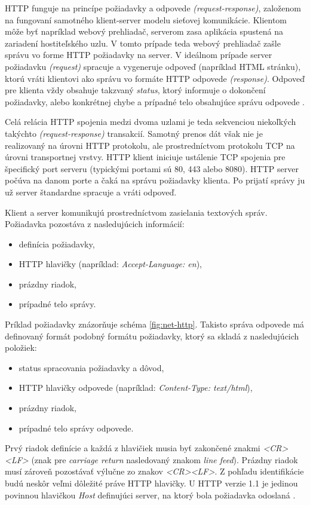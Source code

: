 \documentclass[
  digital, %
  oneside, %
  table,   %
  lof,     %
  nolot,   %
  nocover
]{fithesis3}
\begin{document}
HTTP funguje na princípe požiadavky a odpovede \textit{(request-response)},
založenom na fungovaní samotného klient-server modelu sieťovej komunikácie. Klientom môže byť
napríklad webový prehliadač, serverom zasa aplikácia spustená na zariadení
hostiteľského uzlu. V tomto prípade teda webový prehliadač zašle správu vo
forme HTTP požiadavky na server. V ideálnom prípade server požiadavku
\textit{(request)} spracuje a vygeneruje odpoveď (napríklad HTML stránku),
ktorú vráti klientovi ako správu vo formáte HTTP odpovede \textit{(response)}.
Odpoveď pre klienta vždy obsahuje takzvaný \textit{status}, ktorý informuje o
dokončení požiadavky, alebo konkrétnej chybe a prípadné telo obsahujúce správu odpovede \cite{rfc1123}.

Celá relácia HTTP spojenia medzi dvoma uzlami je teda sekvenciou niekoľkých
takýchto \textit{(request-response)} transakcií. Samotný prenos dát však nie
je realizovaný na úrovni HTTP protokolu, ale prostredníctvom protokolu TCP
na úrovni transportnej vrstvy. HTTP klient iniciuje ustálenie TCP spojenia pre
špecifický port serveru (typickými portami sú 80, 443 alebo 8080). HTTP server
počúva na danom porte a čaká na správu požiadavky klienta. Po prijatí správy ju
už server štandardne spracuje a vráti odpoveď. 

Klient a server komunikujú prostredníctvom zasielania textových správ.
Požiadavka pozostáva z nasledujúcich informácií: 
\begin{itemize}
	\item definícia požiadavky,
	\item HTTP hlavičky (napríklad: \textit{Accept-Language: en}),
	\item prázdny riadok,
	\item prípadné telo správy.
\end{itemize}
\noindent Príklad požiadavky znázorňuje schéma \ref{fig:net-http}.
Takisto správa odpovede má definovaný formát podobný formátu požiadavky, ktorý
sa skladá z nasledujúcich položiek:
\begin{itemize}
	\item status spracovania požiadavky a dôvod,
	\item HTTP hlavičky odpovede (napríklad: \textit{Content-Type: text/html}),
	\item prázdny riadok,
	\item prípadné telo správy odpovede.
\end{itemize}
Prvý riadok definície a každá z hlavičiek musia byť zakončené znakmi
\textit{<CR><LF>}
(znak pre \textit{carriage return} nasledovaný znakom \textit{line feed}).
Prázdny riadok musí zároveň pozostávať výlučne zo znakov \textit{<CR><LF>}.
Z pohľadu identifikácie budú neskôr veľmi dôležité práve HTTP hlavičky. U HTTP
verzie 1.1 je jedinou povinnou hlavičkou \textit{Host} definujúci server, na
ktorý bola požiadavka odoslaná \cite{Berners:2010:HTTP}.
\end{document}
